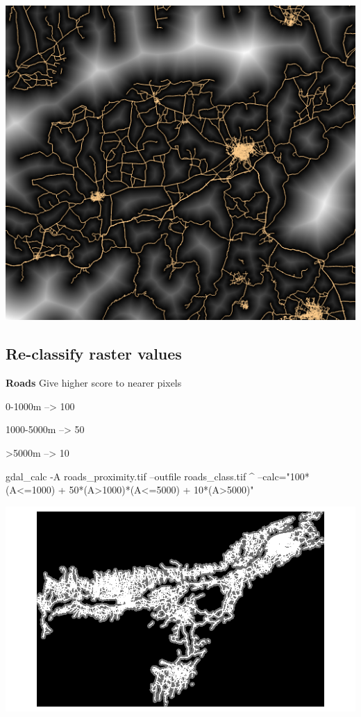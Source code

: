 \documentclass[12pt,a4paper]{article}
\newenvironment{Shaded}{\begin{snugshade}}{\end{snugshade}}
\newcommand{\ExtensionTok}[1]{#1}
\newcommand{\NormalTok}[1]{#1}
\newcommand{\StringTok}[1]{\textcolor[rgb]{0.31,0.60,0.02}{#1}}
\begin{document}
\begin{center}\includegraphics{images/gdal/roads_proximity} \end{center}

\hypertarget{re-classify-raster-values}{%
\subsection{Re-classify raster values}\label{re-classify-raster-values}}

\textbf{Roads} Give higher score to nearer pixels

0-1000m --\textgreater{} 100

1000-5000m --\textgreater{} 50

\textgreater5000m --\textgreater{} 10

\begin{Shaded}
\begin{Highlighting}[]
\ExtensionTok{gdal_calc}\NormalTok{ -A roads_proximity.tif --outfile roads_class.tif ^}
  \ExtensionTok{--calc}\NormalTok{=}\StringTok{"100*(A<=1000) + 50*(A>1000)*(A<=5000) + 10*(A>5000)"}
\end{Highlighting}
\end{Shaded}

\begin{center}\includegraphics{images/gdal/roads_class} \end{center}
\end{document}
